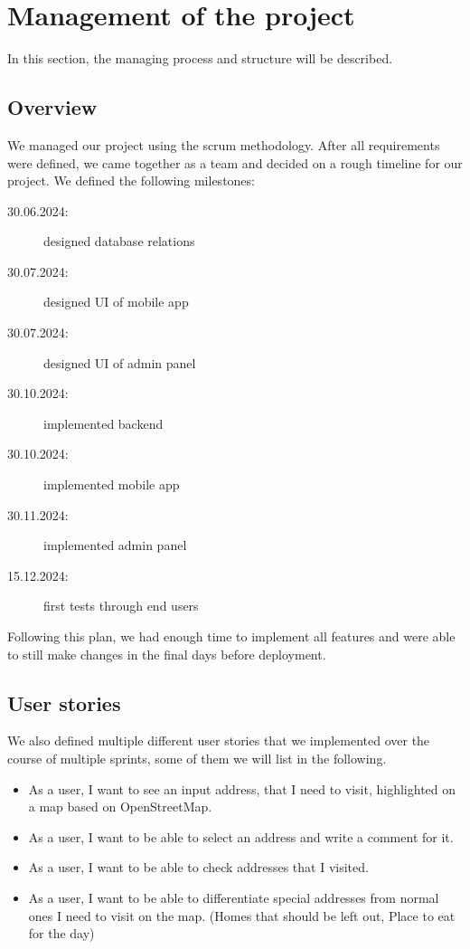 \Author{\daAuthorTwo}

\section{Management of the project}

In this section, the managing process and structure will be described.

\subsection{Overview}
We managed our project using the scrum methodology. After all requirements were defined, we came together as a team and decided on a rough timeline for our project. We defined the following milestones:

\begin{description}
    \item [30.06.2024:] designed database relations
    \item [30.07.2024:] designed UI of mobile app 
    \item [30.07.2024:] designed UI of admin panel
    \item [30.10.2024:] implemented backend
    \item [30.10.2024:] implemented mobile app
    \item [30.11.2024:] implemented admin panel
    \item [15.12.2024:] first tests through end users
\end{description}

Following this plan, we had enough time to implement all features and were able to still make changes in the final days before deployment. 

\subsection{User stories}

We also defined multiple different user stories that we implemented over the course of multiple sprints, some of them we will list in the following.

\begin{itemize}
    \item As a user, I want to see an input address, that I need to visit, highlighted on a map based on OpenStreetMap.
    \item As a user, I want to be able to select an address and write a comment for it.
    \item As a user, I want to be able to check addresses that I visited.
    \item As a user, I want to be able to differentiate special addresses from normal ones I need to visit on the map. (Homes that should be left out, Place to eat for the day)
\end{itemize}

